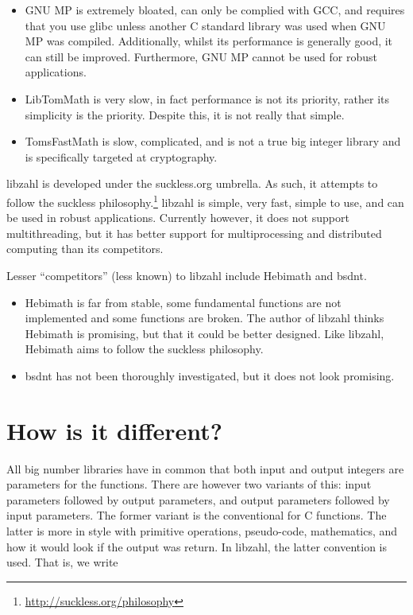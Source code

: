 \begin{itemize}
\item
GNU MP is extremely bloated, can only be complied with
GCC, and requires that you use glibc unless another C
standard library was used when GNU MP was compiled.
Additionally, whilst its performance is generally good,
it can still be improved. Furthermore, GNU MP cannot be
used for robust applications.

\item
LibTomMath is very slow, in fact performance is not its
priority, rather its simplicity is the priority. Despite
this, it is not really that simple.

\item
TomsFastMath is slow, complicated, and is not a true
big integer library and is specifically targeted at
cryptography.
\end{itemize}

libzahl is developed under the suckless.org umbrella.
As such, it attempts to follow the suckless
philosophy.\footnote{\href{http://suckless.org/philosophy}
{http://suckless.org/philosophy}} libzahl is simple,
very fast, simple to use, and can be used in robust
applications. Currently however, it does not support
multithreading, but it has better support for multiprocessing
and distributed computing than its competitors.

Lesser ``competitors'' (less known) to libzahl include
Hebimath and bsdnt.

\begin{itemize}
\item
Hebimath is far from stable, some fundamental functions
are not implemented and some functions are broken. The
author of libzahl thinks Hebimath is promising, but that
it could be better designed. Like libzahl, Hebimath aims
to follow the suckless philosophy.

\item
bsdnt has not been thoroughly investigated, but it
does not look promising.
\end{itemize}


\newpage
\section{How is it different?}
\label{sec:How is it different?}

All big number libraries have in common that both input
and output integers are parameters for the functions.
There are however two variants of this: input parameters
followed by output parameters, and output parameters
followed by input parameters. The former variant is the
conventional for C functions. The latter is more in style
with primitive operations, pseudo-code, mathematics, and
how it would look if the output was return. In libzahl, the
latter convention is used. That is, we write

